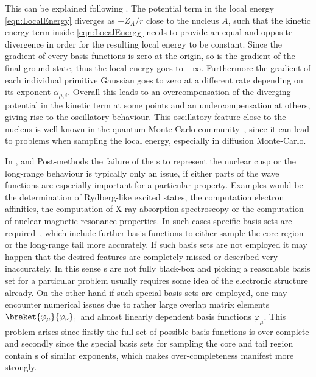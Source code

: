 This can be explained following \cite{Ma2005}.
The potential term in the local energy \eqref{eqn:LocalEnergy} diverges
as $-Z_A/r$ close to the nucleus $A$,
such that the kinetic energy term inside \eqref{eqn:LocalEnergy}
needs to provide an equal and opposite
divergence in order for the resulting local energy to be constant.
Since the gradient of every {\cGTO} basis functions is zero at the origin,
so is the gradient of the final \HF ground state,
thus the local energy goes to $-\infty$.
Furthermore the gradient of each individual primitive Gaussian
goes to zero at a different rate
depending on its exponent $\alpha_{\mu,i}$.
Overall this leads to an overcompensation
of the diverging potential in the kinetic term at some points
and an undercompensation at others,
giving rise to the oscillatory behaviour.
This oscillatory feature close to the nucleus is well-known
in the quantum Monte-Carlo community~\cite{Foulkes2001,Ma2005},
since it can lead to problems when sampling the local energy,
especially in diffusion Monte-Carlo.

In \HF, \DFT and Post-\HF methods
the failure of the {\cGTO}s to represent the nuclear cusp
or the long-range behaviour is typically only an issue,
if either parts of the wave functions are especially important
for a particular property.
Examples would be the determination of Rydberg-like excited states,
the computation electron affinities,
the computation of X-ray absorption spectroscopy
or the computation of nuclear-magnetic resonance properties.
In such cases specific basis sets
are required~\cite{Hill2013,Jensen2013},
which include further \cGTO basis functions
to either sample the core region or the long-range tail more accurately.
If such basis sets are not employed
it may happen that the desired features are completely missed or described very inaccurately.
In this sense {\cGTO}s are not fully black-box and
picking a reasonable basis set for a particular problem
usually requires some idea of the electronic structure already.
On the other hand if such special basis sets are employed,
one may encounter numerical issues
due to rather large overlap matrix elements $\braket{\varphi_\mu}{\varphi_\nu}_1$
and almost linearly dependent basis functions $\varphi_\mu$.
This problem arises
since firstly
the full set of possible \cGTO basis functions is over-complete
and secondly
since the special basis sets for sampling the core and tail region
contain {\cGTO}s of similar exponents,
which makes over-completeness manifest more strongly.

